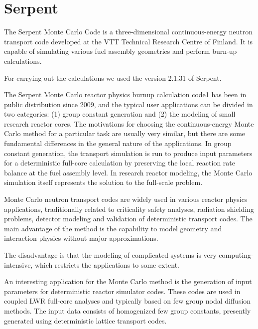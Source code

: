 \documentclass[11pt,letterpaper]{article}
\begin{document}

\section{Serpent}

The Serpent Monte Carlo Code is a three-dimensional continuous-energy neutron transport code developed at the VTT Technical Research Centre of Finland.
It is capable of simulating various fuel assembly geometries and perform burn-up calculations.

For carrying out the calculations we used the version 2.1.31 of Serpent.



\cite{leppanen_development_2007}

The Serpent Monte Carlo reactor physics burnup calculation code1 has been in public distribution since 2009, and the typical user applications can be divided in two categories: (1) group constant generation and (2) the modeling of small research reactor cores. The motivations for choosing the continuous-energy Monte Carlo method for a particular task are usually very similar, but there are some fundamental differences in the general nature of the applications. In group constant generation, the transport simulation is run to produce input parameters for a deterministic full-core calculation by preserving the local reaction rate balance at the fuel assembly level. In research reactor modeling, the Monte Carlo simulation itself represents the solution to the full-scale problem.

\cite{leppanen_calculation_2014}

Monte Carlo neutron transport codes are widely used in various reactor physics
applications, traditionally related to criticality safety analyses, radiation
shielding problems, detector modeling and validation of deterministic transport
codes.
The main advantage of the method is the capability to model geometry and interaction physics without major approximations.

The disadvantage is that the modeling of complicated systems is very computing-intensive, which
restricts the applications to some extent.

An interesting application for the Monte Carlo method is the generation of input parameters for deterministic reactor simulator codes.
These codes are used in coupled LWR full-core analyses and typically based on few group nodal diffusion methods.
The input data consists of homogenized few group constants, presently generated using deterministic lattice transport codes.
\end{document}
